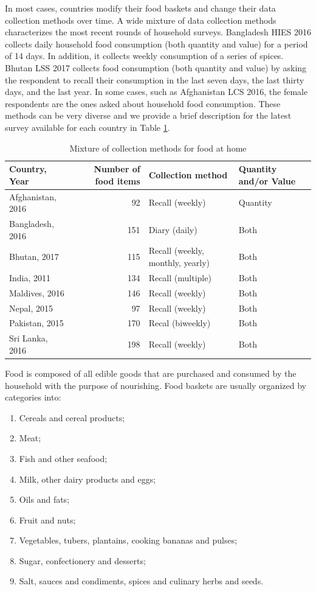 \documentclass[13 pt,]{book}
\providecommand{\tightlist}{%
  \setlength{\itemsep}{0pt}\setlength{\parskip}{0pt}}
\begin{document}
In most cases, countries modify their food baskets and change their data
collection methods over time. A wide mixture of data collection methods
characterizes the most recent rounds of household surveys. Bangladesh
HIES 2016 collects daily household food consumption (both quantity and
value) for a period of 14 days. In addition, it collects weekly
consumption of a series of spices. Bhutan LSS 2017 collects food
consumption (both quantity and value) by asking the respondent to recall
their consumption in the last seven days, the last thirty days, and the
last year. In some cases, such as Afghanistan LCS 2016, the female
respondents are the ones asked about household food consumption. These
methods can be very diverse and we provide a brief description for the
latest survey available for each country in Table \ref{tab:food}.

\begin{table}[t]

\caption{\label{tab:food}Mixture of collection methods for food at home}
\centering
\begin{tabular}{lrll}
\toprule
Country, Year & Number of food items & Collection method & Quantity and/or Value\\
\midrule
Afghanistan, 2016 & 92 & Recall (weekly) & Quantity\\
Bangladesh, 2016 & 151 & Diary (daily) & Both\\
Bhutan, 2017 & 115 & Recall (weekly, monthly, yearly) & Both\\
India, 2011 & 134 & Recall (multiple) & Both\\
Maldives, 2016 & 146 & Recall (weekly) & Both\\
\addlinespace
Nepal, 2015 & 97 & Recall (weekly) & Both\\
Pakistan, 2015 & 170 & Recal (biweekly) & Both\\
Sri Lanka, 2016 & 198 & Recall (weekly) & Both\\
\bottomrule
\end{tabular}
\end{table}

Food is composed of all edible goods that are purchased and consumed by
the household with the purpose of nourishing. Food baskets are usually
organized by categories into:

\begin{enumerate}
\def\labelenumi{\arabic{enumi}.}
\tightlist
\item
  Cereals and cereal products;
\item
  Meat;
\item
  Fish and other seafood;
\item
  Milk, other dairy products and eggs;
\item
  Oils and fats;
\item
  Fruit and nuts;
\item
  Vegetables, tubers, plantains, cooking bananas and pulses;
\item
  Sugar, confectionery and desserts;
\item
  Salt, sauces and condiments, spices and culinary herbs and seeds.
\end{enumerate}
\end{document}
